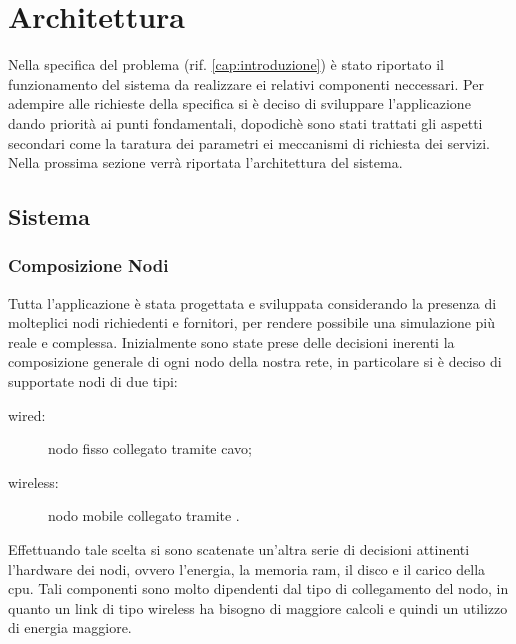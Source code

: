 \chapter{Architettura}\label{cap:architettura}
Nella specifica del problema (rif. \ref{cap:introduzione}) è stato riportato il funzionamento del sistema da realizzare ei relativi componenti neccessari. Per adempire alle richieste della specifica si è deciso di sviluppare l'applicazione dando priorità ai punti fondamentali, dopodichè sono stati trattati gli aspetti secondari come la taratura dei parametri ei meccanismi di richiesta dei servizi. Nella prossima sezione verrà riportata l'architettura del sistema.
\section{Sistema}
\subsection{Composizione Nodi}
Tutta l'applicazione è stata progettata e sviluppata considerando la presenza di molteplici nodi richiedenti e fornitori, per rendere possibile una simulazione più reale e complessa. Inizialmente sono state prese delle decisioni inerenti la composizione generale di ogni nodo della nostra rete, in particolare si è deciso di supportate nodi di due tipi:
\begin{description}
\item[wired:] nodo fisso collegato tramite cavo;
\item[wireless:] nodo mobile collegato tramite .
\end{description}
Effettuando tale scelta si sono scatenate un'altra serie di decisioni attinenti l'hardware dei nodi, ovvero l'energia, la memoria ram, il disco e il carico della cpu. Tali componenti sono molto dipendenti dal tipo di collegamento del nodo, in quanto un link di tipo wireless ha bisogno di maggiore calcoli e quindi un utilizzo di energia maggiore.

